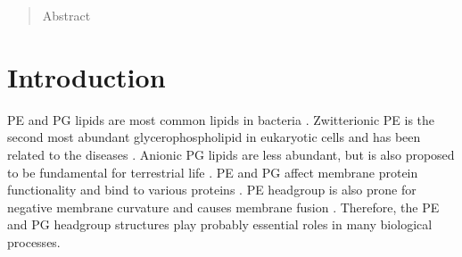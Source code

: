 \documentclass[aps,prl,superscriptaddress,twocolumn]{revtex4}
\begin{document}
\author{O. H. Samuli Ollila}

\author{Chris G. Papadopoulos}


\author{Antonio Pe{\'o}n}

\author{Thomas J. Piggot}

\author{Pierre Poulain}


\date{\today}

\begin{abstract}
Abstract
\end{abstract}


\maketitle %



\section{Introduction}

PE and PG lipids are most common lipids in bacteria \cite{sohlenkamp16}.
Zwitterionic PE is the second most abundant glycerophospholipid in eukaryotic cells
and has been related to the diseases \cite{vance15,calzada16,patel17}.
Anionic PG lipids are less abundant, but is also proposed to be fundamental for terrestrial life \cite{furse17}.
PE and PG affect membrane protein functionality \cite{hariharan18} and bind to various proteins \cite{yeagle14}.
PE headgroup is also prone for negative membrane curvature and causes membrane fusion \cite{Chernomordik08,calzada16}.
Therefore, the PE and PG headgroup structures play probably essential roles in 
many biological processes.
\end{document}
